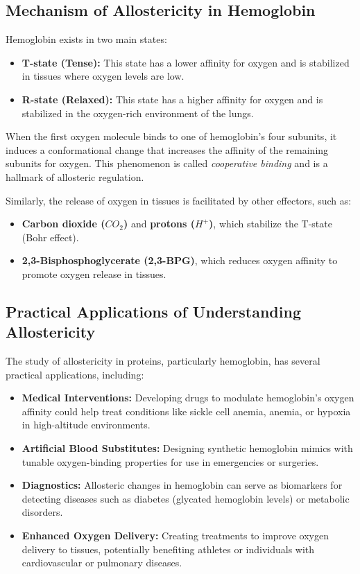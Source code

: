 \documentclass[English, Lau, oneside]{sapthesis}
\begin{document}
\subsection{Mechanism of Allostericity in Hemoglobin}
Hemoglobin exists in two main states:
\begin{itemize}
    \item \textbf{T-state (Tense):} This state has a lower affinity for oxygen and is stabilized in tissues where oxygen levels are low.
    \item \textbf{R-state (Relaxed):} This state has a higher affinity for oxygen and is stabilized in the oxygen-rich environment of the lungs.
\end{itemize}

When the first oxygen molecule binds to one of hemoglobin's four subunits, it induces a conformational change that increases the affinity of the remaining subunits for oxygen. This phenomenon is called \textit{cooperative binding} and is a hallmark of allosteric regulation.

Similarly, the release of oxygen in tissues is facilitated by other effectors, such as:
\begin{itemize}
    \item \textbf{Carbon dioxide (\(CO_2\))} and \textbf{protons (\(H^+\))}, which stabilize the T-state (Bohr effect).
    \item \textbf{2,3-Bisphosphoglycerate (2,3-BPG)}, which reduces oxygen affinity to promote oxygen release in tissues.
\end{itemize}

\subsection{Practical Applications of Understanding Allostericity}
The study of allostericity in proteins, particularly hemoglobin, has several practical applications, including:

\begin{itemize}
    \item \textbf{Medical Interventions:} Developing drugs to modulate hemoglobin’s oxygen affinity could help treat conditions like sickle cell anemia, anemia, or hypoxia in high-altitude environments.
    \item \textbf{Artificial Blood Substitutes:} Designing synthetic hemoglobin mimics with tunable oxygen-binding properties for use in emergencies or surgeries.
    \item \textbf{Diagnostics:} Allosteric changes in hemoglobin can serve as biomarkers for detecting diseases such as diabetes (glycated hemoglobin levels) or metabolic disorders.
    \item \textbf{Enhanced Oxygen Delivery:} Creating treatments to improve oxygen delivery to tissues, potentially benefiting athletes or individuals with cardiovascular or pulmonary diseases.
\end{itemize}
\end{document}
